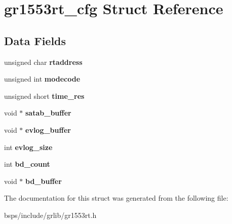 \hypertarget{structgr1553rt__cfg}{}\section{gr1553rt\+\_\+cfg Struct Reference}
\label{structgr1553rt__cfg}
\subsection*{Data Fields}
\begin{DoxyCompactItemize}
\item 
\mbox{\label{structgr1553rt__cfg_a78bb6e69b9f8135e1ede073b6414d65d}} 
unsigned char {\bfseries rtaddress}
\item 
\mbox{\label{structgr1553rt__cfg_a28f87772c026a81d461182f9f4a6bbcb}} 
unsigned int {\bfseries modecode}
\item 
\mbox{\label{structgr1553rt__cfg_a769f591c0bc88b3c86842154e1ee7204}} 
unsigned short {\bfseries time\+\_\+res}
\item 
\mbox{\label{structgr1553rt__cfg_a603def194d65abc075fd0c551bb9decd}} 
void $\ast$ {\bfseries satab\+\_\+buffer}
\item 
\mbox{\label{structgr1553rt__cfg_a9864ccac1f0b9812619b4f7f7871fd4a}} 
void $\ast$ {\bfseries evlog\+\_\+buffer}
\item 
\mbox{\label{structgr1553rt__cfg_aaad930c3c16b3affafec532fbc888baa}} 
int {\bfseries evlog\+\_\+size}
\item 
\mbox{\label{structgr1553rt__cfg_a6b28462d48f4dcfc5013cddf66016ca4}} 
int {\bfseries bd\+\_\+count}
\item 
\mbox{\label{structgr1553rt__cfg_a15cd526706597814a6ab551e603b1c11}} 
void $\ast$ {\bfseries bd\+\_\+buffer}
\end{DoxyCompactItemize}


The documentation for this struct was generated from the following file\+:\begin{DoxyCompactItemize}
\item 
bsps/include/grlib/gr1553rt.\+h\end{DoxyCompactItemize}
